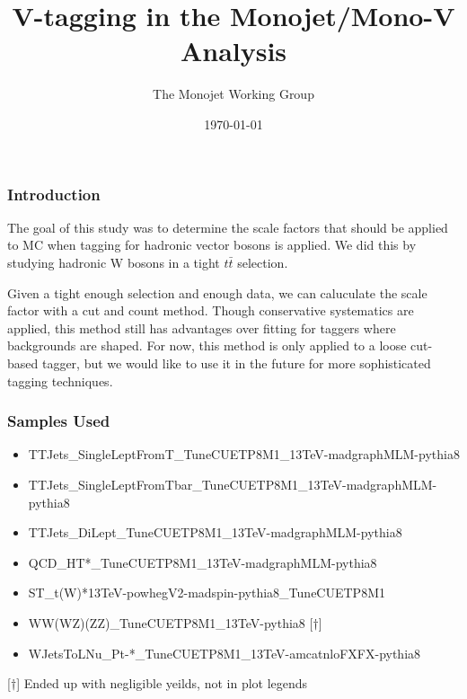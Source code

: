 \documentclass{beamer}
\author[D. Abercrombie]{
  The Monojet Working Group
}
\title{\bf \sffamily V-tagging in the Monojet/Mono-V Analysis}
\date{\today}
\begin{document}
\begin{frame}[nonumbering]
  \titlepage
\end{frame}

\begin{frame}
  \frametitle{Introduction}
  The goal of this study was to determine the scale factors that should
  be applied to MC when tagging for hadronic vector bosons is applied.
  We did this by studying hadronic W bosons in a tight $t\bar{t}$ selection.

  \vspace{12pt}

  Given a tight enough selection and enough data, we can caluculate the 
  scale factor with a cut and count method.
  Though conservative systematics are applied, this method still has advantages
  over fitting for taggers where backgrounds are shaped.
  For now, this method is only applied to a loose cut-based tagger,
  but we would like to use it in the future for more sophisticated tagging techniques.
\end{frame}

\begin{frame}
  \frametitle{Samples Used}
  \begin{itemize}
  \item TTJets\_SingleLeptFromT\_TuneCUETP8M1\_13TeV-madgraphMLM-pythia8
  \item TTJets\_SingleLeptFromTbar\_TuneCUETP8M1\_13TeV-madgraphMLM-pythia8
  \item TTJets\_DiLept\_TuneCUETP8M1\_13TeV-madgraphMLM-pythia8
  \item QCD\_HT*\_TuneCUETP8M1\_13TeV-madgraphMLM-pythia8
  \item ST\_t(W)*13TeV-powhegV2-madspin-pythia8\_TuneCUETP8M1
  \item WW(WZ)(ZZ)\_TuneCUETP8M1\_13TeV-pythia8 [$\dagger$]
  \item WJetsToLNu\_Pt-*\_TuneCUETP8M1\_13TeV-amcatnloFXFX-pythia8
  \end{itemize}
  [$\dagger$] Ended up with negligible yeilds, not in plot legends
\end{frame}
\end{document}
